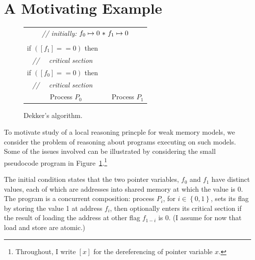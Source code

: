 \documentclass[11pt]{report}
\begin{document}
\section{A Motivating Example}

\begin{figure}[h]
\centering
\begin{tabular}{cc||cc}
  \multicolumn{4}{c}{\textit{// initially:} $f_0 \mapsto 0 \operatorname{\,\ast\,} f_1 \mapsto
  0$}\vspace{0.5em}\\

  \begin{minipage}{0.25\textwidth}
    $\left[f_0\right] := 1;$ \\
    if $(\left[f_1\right] == 0)$ then\\
    \textit{// ~~critical section}
  \end{minipage} & \hspace{0.5cm} & \hspace{0.5cm} &
  \begin{minipage}{0.25\textwidth}
    $\left[f_1\right] := 1;$ \\
    if $(\left[f_0\right] == 0)$ then\\
    \textit{// ~~critical section}
  \end{minipage}\vspace{1em}\\
  \multicolumn{2}{c}{Process $P_0$} & \multicolumn{2}{c}{Process
  $P_1$}\\
\end{tabular}
\caption{\label{fig:dekker} Dekker's algorithm.}
\end{figure}

To motivate study of a local reasoning princple for weak memory models, we consider the problem of reasoning about programs executing on such models. Some of the issues involved can be illustrated by considering the small pseudocode program in Figure~\ref{fig:dekker}.\footnote{Throughout, I write $\left[ x \right]$ for the dereferencing of pointer variable $x$.}

The initial condition states that the two pointer variables, $f_0$ and $f_1$ have distinct values, each of which are addresses into shared memory at which the value is 0. The program is a concurrent composition: process $P_i$, for $i \in \left\lbrace 0,1 \right\rbrace$, sets its flag by storing the value 1 at address $f_i$, then optionally enters its critical section if the result of loading the address at other flag $f_{1-i}$ is 0. (I assume for now that load and store are atomic.)
\end{document}
